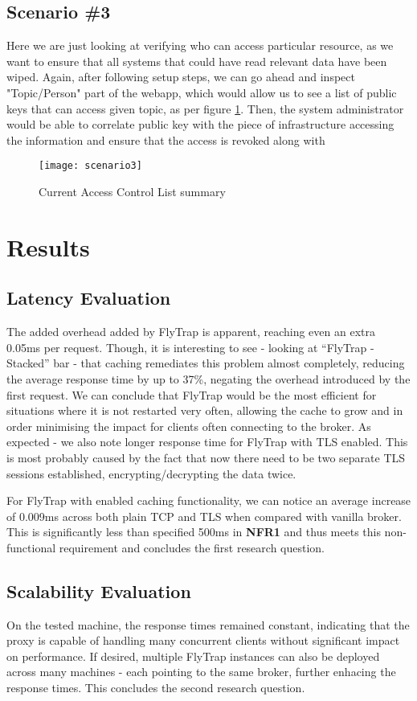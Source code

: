 \subsection{Scenario \#3}
Here we are just looking at verifying who can access particular resource, as we want to ensure that all systems that could have read relevant data have been wiped. Again, after following setup steps, we can go ahead and inspect "Topic/Person" part of the webapp, which would allow us to see a list of public keys that can access given topic, as per figure \ref{fig:scenario3}. Then, the system administrator would be able to correlate public key with the piece of infrastructure accessing the information and ensure that the access is revoked along with 
\begin{figure}[h]
    \centering
    \texttt{[image: scenario3]}
    \caption{Current Access Control List summary}
    \label{fig:scenario3}
\end{figure}
\section{Results}
\subsection{Latency Evaluation}
The added overhead added by FlyTrap is apparent, reaching even an extra 0.05ms per request. Though, it is interesting to see - looking at ``FlyTrap - Stacked'' bar - that caching remediates this problem almost completely, reducing the average response time by up to 37\%, negating the overhead introduced by the first request. We can conclude that FlyTrap would be the most efficient for situations where it is not restarted very often, allowing the cache to grow and in order minimising the impact for clients often connecting to the broker. As expected - we also note longer response time for FlyTrap with TLS enabled. This is most probably caused by the fact that now there need to be two separate TLS sessions established, encrypting/decrypting the data twice.

For FlyTrap with enabled caching functionality, we can notice an average increase of 0.009ms across both plain TCP and TLS when compared with vanilla broker. This is significantly less than specified 500ms in \textbf{NFR1} and thus meets this non-functional requirement and concludes the first research question.
\subsection{Scalability Evaluation}
On the tested machine, the response times remained constant, indicating that the proxy is capable of handling many concurrent clients without significant impact on performance. If desired, multiple FlyTrap instances can also be deployed across many machines - each pointing to the same broker, further enhacing the response times. This concludes the second research question.
